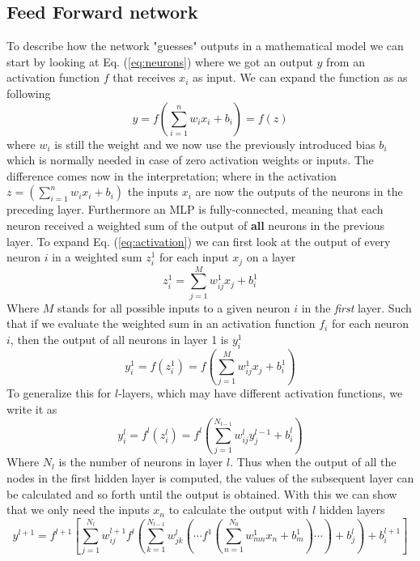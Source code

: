 \documentclass[12pt, a4paper]{book}
\begin{document}
\subsection{Feed Forward network}\label{sec:FFN}
To describe how the network "guesses" outputs in a mathematical model we can start by looking at Eq. (\ref{eq:neurons}) where we got an output $y$ from an activation function $f$ that receives $x_i$ as input. 
We can expand the function as as following
\begin{equation}\label{eq:activation}
    y=f\left(\sum_{i=1}^nw_ix_i+b_i\right)=f(z)
\end{equation} 
where $w_i$ is still the weight and we now use the previously introduced bias $b_i$ which is normally needed in case of zero activation weights or inputs. The difference comes now in the interpretation; where in the activation 
$z=(\sum_{i=1}^nw_ix_i+b_i)$ the inputs $x_i$ are now the outputs of the neurons in the preceding layer. Furthermore an MLP is fully-connected, meaning that each neuron received a weighted sum of the output of \textbf{all} 
neurons in the previous layer. To expand Eq. (\ref{eq:activation}) we can first look at the output of every neuron $i$ in a weighted sum $z^1_i$ for each input $x_j$ on a layer
\begin{equation}\label{eq:weightedsum}
    z_i^1=\sum_{j=1}^Mw_{ij}^1x_j + b^1_i
\end{equation}
Where $M$ stands for all possible inputs to a given neuron $i$ in the \textit{first} layer. Such that if we evaluate the weighted sum in an activation function $f_i$ for each neuron $i$, 
then the output of all neurons in layer 1 is $y_i^1$
$$
    y^1_i=f(z_i^1)=f\left(\sum_{j=1}^Mw_{ij}^1x_j + b^1_i\right)
$$
To generalize this for $l$-layers, which may have different activation functions, we write it as
$$
    y^l_i=f^l(z_i^l)=f^l\left(\sum_{j=1}^{N_{l-1}}w_{ij}^ly^{l-1}_j + b^l_i\right)
$$
Where $N_l$ is the number of neurons in layer $l$. Thus when the output of all the nodes in the first hidden layer is computed, the values of the subsequent layer can be calculated and so forth until the output is obtained. 
With this we can show that we only need the inputs $x_n$ to calculate the output with $l$ hidden layers
\begin{equation}\label{eq:MLP}
    y^{l+1}=f^{l+1}\left[\sum_{j=1}^{N_l}w^{l+1}_{ij}f^l\left(\sum_{k=1}^{N_{l-1}}w^{l}_{jk}\left(\cdots f^{1}\left(\sum_{n=1}^{N_0}w^1_{mn}x_n+b_m^1\right)\cdots\right)+b_j^{l}\right)+b^{l+1}_i   \right]
\end{equation}
\end{document}
